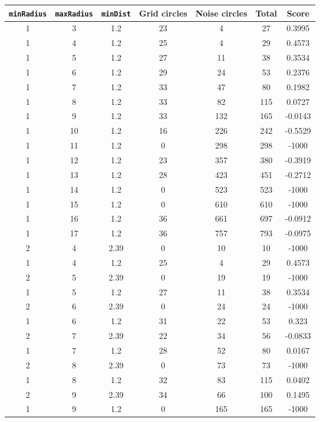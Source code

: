 \documentclass[letterpaper, 12pt]{article}
\begin{document}
\begin{longtable}{|c|c|c|c|c|c|c|}
\hline
\textbf{\texttt{minRadius}} & \textbf{\texttt{maxRadius}} & \textbf{\texttt{minDist}} & \textbf{Grid circles} & \textbf{Noise circles} & \textbf{Total} & \textbf{Score} \\
\hline
1 & 3 & 1.2 & 23 & 4 & 27 & 0.3995 \\
\hline
1 & 4 & 1.2 & 25 & 4 & 29 & 0.4573 \\
\hline
1 & 5 & 1.2 & 27 & 11 & 38 & 0.3534 \\
\hline
1 & 6 & 1.2 & 29 & 24 & 53 & 0.2376 \\
\hline
1 & 7 & 1.2 & 33 & 47 & 80 & 0.1982 \\
\hline
1 & 8 & 1.2 & 33 & 82 & 115 & 0.0727 \\
\hline
1 & 9 & 1.2 & 33 & 132 & 165 & -0.0143 \\
\hline
1 & 10 & 1.2 & 16 & 226 & 242 & -0.5529 \\
\hline
1 & 11 & 1.2 & 0 & 298 & 298 & -1000 \\
\hline
1 & 12 & 1.2 & 23 & 357 & 380 & -0.3919 \\
\hline
1 & 13 & 1.2 & 28 & 423 & 451 & -0.2712 \\
\hline
1 & 14 & 1.2 & 0 & 523 & 523 & -1000 \\
\hline
1 & 15 & 1.2 & 0 & 610 & 610 & -1000 \\
\hline
1 & 16 & 1.2 & 36 & 661 & 697 & -0.0912 \\
\hline
1 & 17 & 1.2 & 36 & 757 & 793 & -0.0975 \\
\hline
2 & 4 & 2.39 & 0 & 10 & 10 & -1000 \\
\hline
1 & 4 & 1.2 & 25 & 4 & 29 & 0.4573 \\
\hline
2 & 5 & 2.39 & 0 & 19 & 19 & -1000 \\
\hline
1 & 5 & 1.2 & 27 & 11 & 38 & 0.3534 \\
\hline
2 & 6 & 2.39 & 0 & 24 & 24 & -1000 \\
\hline
1 & 6 & 1.2 & 31 & 22 & 53 & 0.323 \\
\hline
2 & 7 & 2.39 & 22 & 34 & 56 & -0.0833 \\
\hline
1 & 7 & 1.2 & 28 & 52 & 80 & 0.0167 \\
\hline
2 & 8 & 2.39 & 0 & 73 & 73 & -1000 \\
\hline
1 & 8 & 1.2 & 32 & 83 & 115 & 0.0402 \\
\hline
2 & 9 & 2.39 & 34 & 66 & 100 & 0.1495 \\
\hline
1 & 9 & 1.2 & 0 & 165 & 165 & -1000 \\

\end{longtable}
\end{document}
